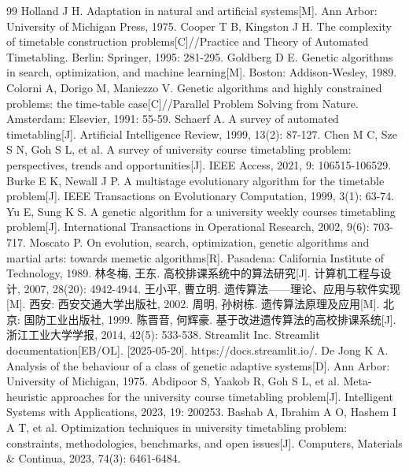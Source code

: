 \clearpage
\hspace*{\fill}
\heiti
\begin{thebibliography}{99}
	\large
	\setlength{\itemsep}{1.5pt}
	Holland J H. Adaptation in natural and artificial systems[M]. Ann Arbor: University of Michigan Press, 1975.
	Cooper T B, Kingston J H. The complexity of timetable construction problems[C]//Practice and Theory of Automated Timetabling. Berlin: Springer, 1995: 281-295.
	Goldberg D E. Genetic algorithms in search, optimization, and machine learning[M]. Boston: Addison-Wesley, 1989.
	Colorni A, Dorigo M, Maniezzo V. Genetic algorithms and highly constrained problems: the time-table case[C]//Parallel Problem Solving from Nature. Amsterdam: Elsevier, 1991: 55-59.
	Schaerf A. A survey of automated timetabling[J]. Artificial Intelligence Review, 1999, 13(2): 87-127.
	Chen M C, Sze S N, Goh S L, et al. A survey of university course timetabling problem: perspectives, trends and opportunities[J]. IEEE Access, 2021, 9: 106515-106529.
	Burke E K, Newall J P. A multistage evolutionary algorithm for the timetable problem[J]. IEEE Transactions on Evolutionary Computation, 1999, 3(1): 63-74.
	Yu E, Sung K S. A genetic algorithm for a university weekly courses timetabling problem[J]. International Transactions in Operational Research, 2002, 9(6): 703-717.
	Moscato P. On evolution, search, optimization, genetic algorithms and martial arts: towards memetic algorithms[R]. Pasadena: California Institute of Technology, 1989.
	林冬梅, 王东. 高校排课系统中的算法研究[J]. 计算机工程与设计, 2007, 28(20): 4942-4944.
	王小平, 曹立明. 遗传算法——理论、应用与软件实现[M]. 西安: 西安交通大学出版社, 2002.
	周明, 孙树栋. 遗传算法原理及应用[M]. 北京: 国防工业出版社, 1999.
	陈晋音, 何辉豪. 基于改进遗传算法的高校排课系统[J]. 浙江工业大学学报, 2014, 42(5): 533-538.
	Streamlit Inc. Streamlit documentation[EB/OL]. [2025-05-20]. https://docs.streamlit.io/.
	De Jong K A. Analysis of the behaviour of a class of genetic adaptive systems[D]. Ann Arbor: University of Michigan, 1975.
	Abdipoor S, Yaakob R, Goh S L, et al. Meta-heuristic approaches for the university course timetabling problem[J]. Intelligent Systems with Applications, 2023, 19: 200253.
	Bashab A, Ibrahim A O, Hashem I A T, et al. Optimization techniques in university timetabling problem: constraints, methodologies, benchmarks, and open issues[J]. Computers, Materials \& Continua, 2023, 74(3): 6461-6484.

\end{thebibliography}
